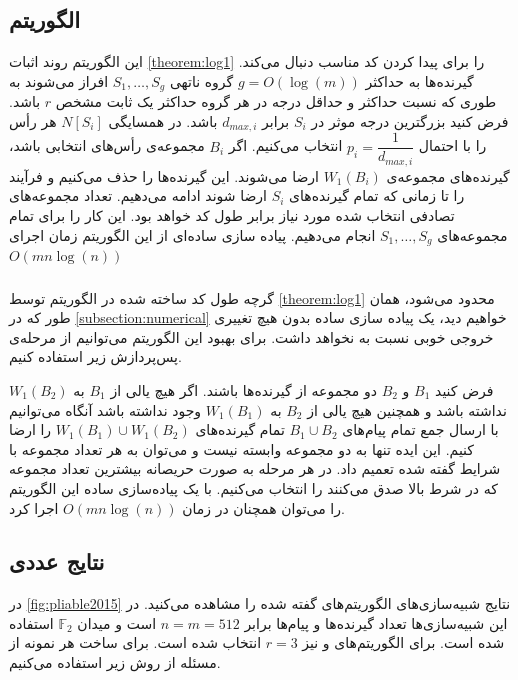 \subsection{الگوریتم }
این الگوریتم روند اثبات
\autoref{theorem:log1}
را برای پیدا کردن کد مناسب دنبال می‌کند. گیرنده‌ها به حداکثر
$g = O(\log(m))$
گروه ناتهی
$S_1, \ldots, S_g$
افراز می‌شوند به طوری که نسبت حداکثر و حداقل درجه در هر گروه حداکثر یک ثابت مشخص
$r$
باشد. فرض کنید بزرگترین درجه موثر در
$S_i$
برابر
$d_{max, i}$
باشد. در همسایگی
$N[S_i]$
هر رأس را با احتمال
$p_i = \dfrac{1}{d_{max, i}}$
انتخاب می‌کنیم. اگر
$B_i$
مجموعه‌ی رأس‌های انتخابی باشد، گیرنده‌های مجموعه‌ی
$W_1(B_i)$
ارضا می‌شوند. این گیرنده‌ها را حذف می‌کنیم و فرآیند را تا زمانی که تمام گیرنده‌های
$S_i$
ارضا شوند ادامه می‌دهیم. تعداد مجموعه‌های تصادفی انتخاب شده مورد نیاز برابر طول کد خواهد بود. این کار را برای تمام مجموعه‌های
$S_1, \ldots, S_g$
انجام می‌دهیم. پیاده سازی ساده‌ای از این الگوریتم زمان اجرای
$O(m n \log(n))$

\subsubsection{}
گرچه طول کد ساخته شده در الگوریتم
توسط
\autoref{theorem:log1}
محدود می‌شود، همان طور که در
\autoref{subsection:numerical}
خواهیم دید، یک پیاده سازی ساده بدون هیچ تغییری خروجی خوبی نسبت به
نخواهد داشت. برای بهبود این الگوریتم می‌توانیم از مرحله‌ی پس‌پردازش زیر استفاده کنیم.

فرض کنید
$B_1$
و
$B_2$
دو مجموعه از گیرنده‌ها باشند. اگر هیچ یالی از
$B_1$
به
$W_1(B_2)$
نداشته باشد و همچنین هیچ یالی از
$B_2$
به
$W_1(B_1)$
وجود نداشته باشد آنگاه می‌توانیم با ارسال جمع تمام پیام‌های
$B_1 \cup B_2$
تمام گیرنده‌های
$W_1(B_1) \cup W_1(B_2)$
را ارضا کنیم. این ایده تنها به دو مجموعه وابسته نیست و می‌توان به هر تعداد مجموعه با شرایط گفته شده تعمیم داد. در هر مرحله به صورت حریصانه بیشترین تعداد مجموعه که در شرط بالا صدق می‌کنند را انتخاب می‌کنیم. با یک پیاده‌سازی ساده این الگوریتم را می‌توان همچنان در زمان
$O(m n \log(n))$
اجرا کرد.
\subsection{
    نتایج عددی
}
\label{subsection:numerical}
در
\autoref{fig:pliable2015}
نتایج شبیه‌سازی‌های الگوریتم‌های گفته شده را مشاهده می‌کنید. در این شبیه‌سازی‌ها تعداد گیرنده‌ها و پیام‌ها برابر
$n = m = 512$
است و میدان
$\mathbb{F}_2$
استفاده شده است. برای الگوریتم‌های
و
نیز
$r = 3$
انتخاب شده است. برای ساخت هر نمونه از مسئله از روش زیر استفاده می‌کنیم.

